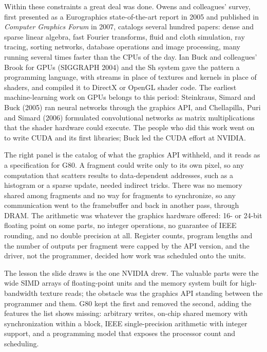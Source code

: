 \documentclass[11pt,letterpaper]{article}
\begin{document}
Within these constraints a great deal was done. Owens and colleagues' survey, first presented as a Eurographics state-of-the-art report in 2005 and published in \emph{Computer Graphics Forum} in 2007, catalogs several hundred papers: dense and sparse linear algebra, fast Fourier transforms, fluid and cloth simulation, ray tracing, sorting networks, database operations and image processing, many running several times faster than the CPUs of the day. Ian Buck and colleagues' Brook for GPUs (SIGGRAPH 2004) and the Sh system gave the pattern a programming language, with streams in place of textures and kernels in place of shaders, and compiled it to DirectX or OpenGL shader code. The earliest machine-learning work on GPUs belongs to this period: Steinkraus, Simard and Buck (2005) ran neural networks through the graphics API, and Chellapilla, Puri and Simard (2006) formulated convolutional networks as matrix multiplications that the shader hardware could execute. The people who did this work went on to write CUDA and its first libraries; Buck led the CUDA effort at NVIDIA.

The right panel is the catalog of what the graphics API withheld, and it reads as a specification for G80. A fragment could write only to its own pixel, so any computation that scatters results to data-dependent addresses, such as a histogram or a sparse update, needed indirect tricks. There was no memory shared among fragments and no way for fragments to synchronize, so any communication went to the framebuffer and back in another pass, through DRAM. The arithmetic was whatever the graphics hardware offered: 16- or 24-bit floating point on some parts, no integer operations, no guarantee of IEEE rounding, and no double precision at all. Register counts, program lengths and the number of outputs per fragment were capped by the API version, and the driver, not the programmer, decided how work was scheduled onto the units.

The lesson the slide draws is the one NVIDIA drew. The valuable parts were the wide SIMD arrays of floating-point units and the memory system built for high-bandwidth texture reads; the obstacle was the graphics API standing between the programmer and them. G80 kept the first and removed the second, adding the features the list shows missing: arbitrary writes, on-chip shared memory with synchronization within a block, IEEE single-precision arithmetic with integer support, and a programming model that exposes the processor count and scheduling.
\end{document}
